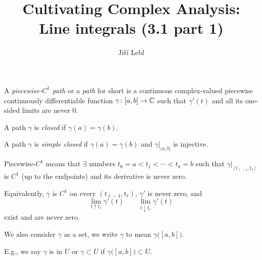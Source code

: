 \documentclass[10pt,aspectratio=169]{beamer}
\author{Ji\v{r}\'i Lebl}
\institute[OSU]{%
Departemento pri Matematiko de Oklahoma {\^S}tata Universitato}
\title{Cultivating Complex Analysis:\\%
Line integrals (3.1 part 1)}
\date{}
\begin{document}
\begin{frame}
\titlepage
\end{frame}

\begin{frame}
A \emph{piecewise-$C^1$ path} or a \emph{path} for short
is
a continuous complex-valued piecewise continuously
differentiable function $\gamma \colon [a,b] \to {\mathbb{C}}$ 
such that $\gamma'(t)$ and all its one-sided limits are never
0.

\medskip
\pause

A path $\gamma$ is \emph{closed} if $\gamma(a)=\gamma(b)$.

\medskip
\pause

A path $\gamma$ is \emph{simple closed}
if $\gamma(a)=\gamma(b)$ and $\gamma|_{(a,b]}$ is injective.

\medskip
\pause

Piecewise-$C^1$ means that $\exists$ numbers $t_0 = a < t_1 < \cdots < t_k = b$
such that $\gamma|_{[t_{\ell-1},t_\ell]}$ is $C^1$ (up to the endpoints)
and its derivative is never zero.

\medskip
\pause

Equivalently, $\gamma$ is $C^1$ on every $(t_{\ell-1},t_\ell)$, $\gamma'$ is
never zero, and
\[
\lim_{t \uparrow t_\ell} \gamma'(t) \qquad
\lim_{t \downarrow t_\ell} \gamma'(t)
\]
exist and are never zero.

\medskip
\pause

We also consider $\gamma$ as a set, we write $\gamma$ to mean $\gamma\bigl([a,b]\bigr)$.

\medskip
\pause

E.g.,
we say $\gamma$ is in $U$ or $\gamma \subset U$ if
$\gamma\bigl([a,b]\bigr) \subset U$.
\end{frame}
\end{document}
